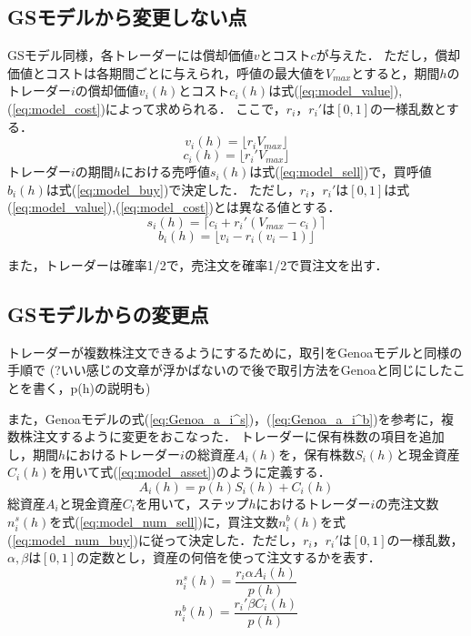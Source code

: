 \documentclass[titlepage]{jsreport}
\begin{document}
\subsection{GSモデルから変更しない点}
GSモデル同様，各トレーダーには償却価値$v$とコスト$c$が与えた．
ただし，償却価値とコストは各期間ごとに与えられ，呼値の最大値を$V_{max}$とすると，期間$h$のトレーダー$i$の償却価値$v_i(h)$とコスト$c_i(h)$は式(\ref{eq:model_value}),(\ref{eq:model_cost})によって求められる．
ここで，$r_i$，$r_i'$は$[0, 1]$の一様乱数とする．
\begin{equation}
    v_i(h) = \lfloor r_i V_{max} \rfloor \label{eq:model_value}
\end{equation}
\begin{equation}
    c_i(h) = \lfloor r_i' V_{max} \rfloor \label{eq:model_cost}
\end{equation}
トレーダー$i$の期間$h$における売呼値$s_i(h)$は式(\ref{eq:model_sell})で，買呼値$b_i(h)$は式(\ref{eq:model_buy})で決定した．
ただし，$r_i$，$r_i'$は$[0, 1]$は式(\ref{eq:model_value}),(\ref{eq:model_cost})とは異なる値とする．
\begin{equation}
    s_i(h) = \lceil c_i + r_i' (V_{max} - c_i) \rceil \label{eq:model_sell}
\end{equation}
\begin{equation}
    b_i(h) = \lfloor v_i - r_i (v_i - 1) \rfloor \label{eq:model_buy}
\end{equation}

また，トレーダーは確率1/2で，売注文を確率1/2で買注文を出す．

\subsection{GSモデルからの変更点}
トレーダーが複数株注文できるようにするために，取引をGenoaモデルと同様の手順で
(?いい感じの文章が浮かばないので後で取引方法をGenoaと同じにしたことを書く，p(h)の説明も)

また，Genoaモデルの式(\ref{eq:Genoa_a_i^s})，(\ref{eq:Genoa_a_i^b})を参考に，複数株注文するように変更をおこなった．
トレーダーに保有株数の項目を追加し，期間$h$におけるトレーダー$i$の総資産$A_i(h)$を，保有株数$S_i(h)$と現金資産$C_i(h)$を用いて式(\ref{eq:model_asset})のように定義する．
\begin{equation}
    A_i(h) = p(h) S_i(h) + C_i(h) \label{eq:model_asset}
\end{equation}
総資産$A_i$と現金資産$C_i$を用いて，ステップ$h$におけるトレーダー$i$の売注文数$n_i^s(h)$を式(\ref{eq:model_num_sell})に，買注文数$n_i^b(h)$を式(\ref{eq:model_num_buy})に従って決定した．ただし，$r_i$，$r_i'$は$[0, 1]$の一様乱数，$\alpha, \beta$は$[0, 1]$の定数とし，資産の何倍を使って注文するかを表す．
\begin{equation}
    n_i^s(h) = \frac{r_i \alpha A_i(h)}{p(h)} \label{eq:model_num_sell}
\end{equation}
\begin{equation}
    n_i^b(h) = \frac{r_i' \beta C_i(h)}{p(h)} \label{eq:model_num_buy}
\end{equation}
\end{document}
